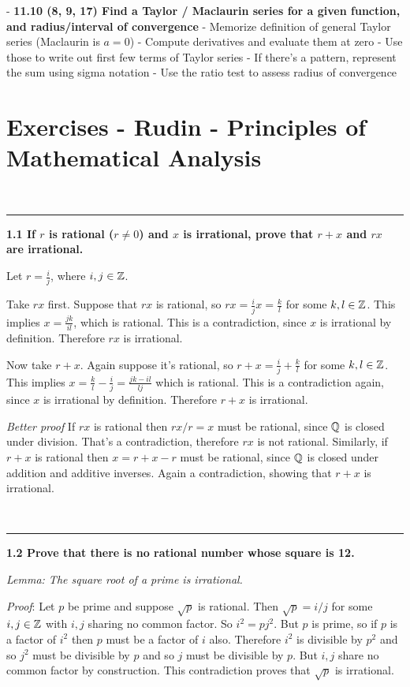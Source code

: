 - \textbf{11.10 (8, 9, 17) Find a Taylor / Maclaurin series for a given function, and radius/interval of convergence}
    - Memorize definition of general Taylor series (Maclaurin is $a=0$)
    - Compute derivatives and evaluate them at zero
    - Use those to write out first few terms of Taylor series
    - If there's a pattern, represent the sum using sigma notation
    - Use the ratio test to assess radius of convergence


\section{Exercises - Rudin - Principles of Mathematical Analysis}

~\\\hrule
\textbf{1.1 If $r$ is rational ($r \neq 0$) and $x$ is irrational, prove that $r + x$
and $rx$ are irrational.}

Let $r = \frac{i}{j}$, where $i, j \in \mathbb{Z}$.

Take $rx$ first. Suppose that $rx$ is rational, so $rx = \frac{i}{j}x =
\frac{k}{l}$ for some $k, l \in \mathbb{Z}$. This implies $x = \frac{jk}{il}$, which is
rational. This is a contradiction, since $x$ is irrational by
definition. Therefore $rx$ is irrational.

Now take $r + x$. Again suppose it's rational, so $r + x = \frac{i}{j} +
\frac{k}{l}$ for some $k, l \in \mathbb{Z}$. This implies $x = \frac{k}{l} -
\frac{i}{j} = \frac{jk - il}{lj}$ which is rational. This is a contradiction
again, since $x$ is irrational by definition. Therefore $r + x$ is irrational.

\textit{Better proof} If $rx$ is rational then $rx/r = x$ must be rational, since $\mathbb{Q}$
is closed under division. That's a contradiction, therefore $rx$ is not
rational. Similarly, if $r + x$ is rational then $x = r + x - r$ must be
rational, since $\mathbb{Q}$ is closed under addition and additive inverses. Again a
contradiction, showing that $r+x$ is irrational.

~\\\hrule
\textbf{1.2 Prove that there is no rational number whose square is 12.}

\textit{Lemma: The square root of a prime is irrational.}

\textit{Proof}: Let $p$ be prime and suppose $\sqrt{p}$ is rational. Then $\sqrt{p} =
i/j$ for some $i, j \in \mathbb{Z}$ with $i,j$ sharing no common factor. So $i^2 =
pj^2$. But $p$ is prime, so if $p$ is a factor of $i^2$ then $p$ must be a
factor of $i$ also. Therefore $i^2$ is divisible by $p^2$ and so $j^2$ must be
divisible by $p$ and so $j$ must be divisible by $p$. But $i,j$ share no common
factor by construction. This contradiction proves that $\sqrt{p}$ is
irrational.

